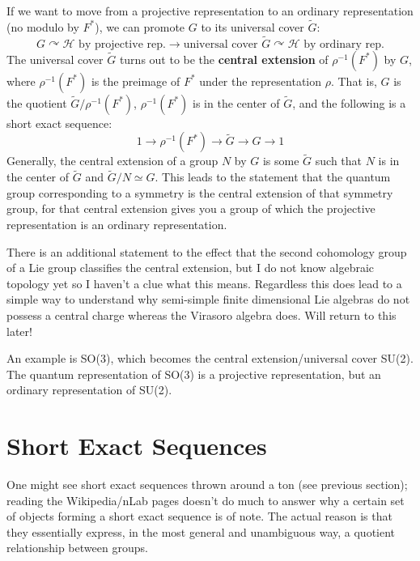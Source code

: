 \documentclass{report}
\begin{document}
 If we want to move from a projective representation to an ordinary
representation (no modulo by $ F^\ast $), we can promote $ G $ to its universal 
cover $ \tilde{G} $: 
\begin{equation*}
	G \curvearrowright \mathcal{H} \text{ by projective rep.}
	\longrightarrow
	\text{universal cover }\tilde{G} \curvearrowright \mathcal{H}
	\text{ by ordinary rep.}
\end{equation*}
The universal cover $ \tilde{G} $ turns out to be the \textbf{central extension}
of $ \rho^{-1}(F^\ast) $ by $ G $, where $ \rho^{-1}(F^\ast) $ is the preimage of
$ F^\ast $ under the representation $ \rho $. That is, $ G $ is the quotient $
\tilde{G}/\rho^{-1}(F^\ast) $, $ \rho^{-1}(F^\ast) $ is in the center of $
\tilde{G} $, and the following is a short exact sequence: 
\begin{equation*}
	1 \rightarrow \rho^{-1}(F^\ast) \rightarrow \tilde{G} \rightarrow G \rightarrow 1
\end{equation*}
Generally, the central extension of a group $ N $ by $ G $ is some $ \tilde{G} $ such 
that $ N $ is in the center of $ \tilde{G} $ and $ \tilde{G}/N \simeq  G $.
This leads to the statement that the quantum group corresponding to a symmetry 
is the central extension of that symmetry group, for that central extension 
gives you a group of which the projective representation is an ordinary 
representation. 

There is an additional statement to the effect that the second cohomology group 
of a Lie group classifies the central extension, but I do not know algebraic 
topology yet so I haven't a clue what this means. Regardless this does lead to a 
simple way to understand why semi-simple finite dimensional Lie algebras do not 
possess a central charge whereas the Virasoro algebra does. Will return to this 
later!

 An example is SO(3), which becomes the central
extension/universal cover SU(2). The quantum representation of SO(3) is a 
projective representation, but an ordinary representation of SU(2). 

\section{Short Exact Sequences}
One might see short exact sequences thrown around a ton (see previous section);
reading the Wikipedia/nLab pages doesn't do much to answer why a certain set of
objects forming a short exact sequence is of note. The actual reason is that 
they essentially express, in the most general and unambiguous way, a quotient 
relationship between groups. 
\end{document}
